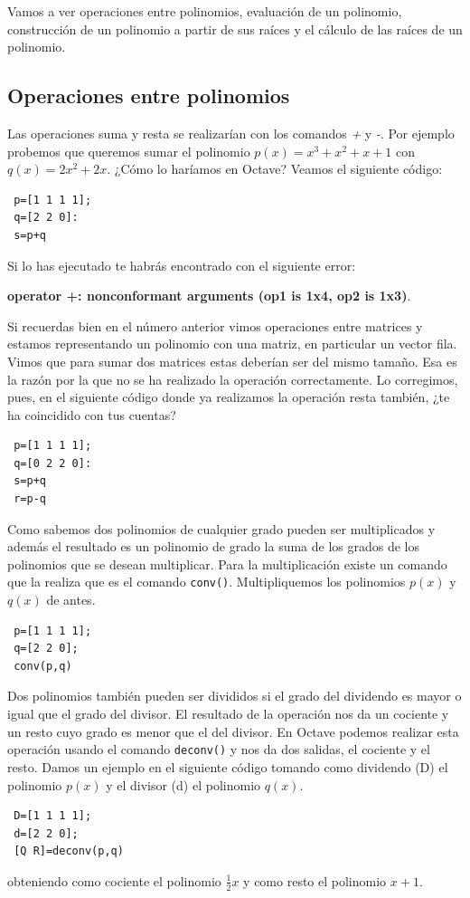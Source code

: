Vamos a ver operaciones entre polinomios, evaluación de un polinomio, construcción de un polinomio a partir de sus raíces y el cálculo de las raíces de un polinomio.
\subsection{Operaciones entre polinomios}
Las operaciones suma y resta se realizarían con los comandos \textsl{+} y \textsl{-}. Por ejemplo probemos que queremos sumar el polinomio $p(x)=x^3+x^2+x+1$ con $q(x)=2x^2+2x$. ¿Cómo lo haríamos en Octave? Veamos el siguiente código:
\begin{octavebox}
\begin{verbatim}
 p=[1 1 1 1];
 q=[2 2 0]:
 s=p+q
\end{verbatim}
\end{octavebox}
Si lo has ejecutado te habrás encontrado con el siguiente error:

\textbf{operator +: nonconformant arguments (op1 is 1x4, op2 is 1x3)}. 

Si recuerdas bien en el número anterior vimos operaciones entre matrices y estamos representando un polinomio con una matriz, en particular un vector fila. Vimos que para sumar dos matrices estas deberían ser del mismo tamaño. Esa es la razón por la que no se ha realizado la operación correctamente. Lo corregimos, pues, en el siguiente código donde ya realizamos la operación resta también, ¿te ha coincidido con tus cuentas?
\begin{octavebox}
\begin{verbatim}
 p=[1 1 1 1];
 q=[0 2 2 0]:
 s=p+q
 r=p-q
\end{verbatim}
\end{octavebox}

Como sabemos dos polinomios de cualquier grado pueden ser multiplicados y además el resultado es un polinomio de grado la suma de los grados de los polinomios que se desean multiplicar. Para la multiplicación existe un comando que la realiza que es el comando \texttt{conv()}. Multipliquemos los polinomios $p(x)$ y $q(x)$ de antes.
\begin{octavebox}
\begin{verbatim}
 p=[1 1 1 1];
 q=[2 2 0];
 conv(p,q)
\end{verbatim}
\end{octavebox}

Dos polinomios también pueden ser divididos si el grado del dividendo es mayor o igual que el grado del divisor. El resultado de la operación nos da un cociente y un resto cuyo grado es menor que el del divisor. En Octave podemos realizar esta operación usando el comando \texttt{deconv()} y nos da dos salidas, el cociente y el resto. Damos un ejemplo en el siguiente código tomando como dividendo (D) el polinomio $p(x)$ y el divisor (d) el polinomio $q(x)$.
\begin{octavebox}
\begin{verbatim}
 D=[1 1 1 1];
 d=[2 2 0];
 [Q R]=deconv(p,q)
\end{verbatim}
\end{octavebox}
obteniendo como cociente el polinomio $\frac{1}{2}x$ y como resto el polinomio $x+1$.

